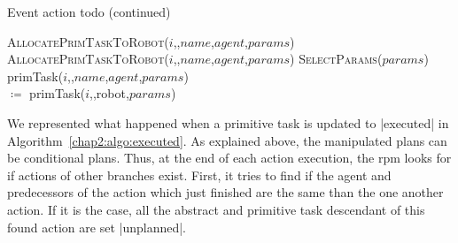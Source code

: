 \documentclass[a4paper,11pt,twoside]{StyleThese}
\begin{document}
\begin{algorithm}[!htb]
	\ContinuedFloat
	\caption{Event action todo (continued)}
	\begin{algorithmic}
			\State \textsc{AllocatePrimTaskToRobot($i$,,$name$,$agent$,$params$)}
		\Else
			\\
			\EndWhile
				\State \textsc{AllocatePrimTaskToRobot($i$,,$name$,$agent$,$params$)}
			\EndIf
		\EndIf
	\EndFunction
	\Statex
		\State \textsc{SelectParams($params$)}
		\State primTask($i$,,$name$,$agent$,$params$) 
		\\\hfill $\coloneqq$ primTask($i$,,robot,$params$)
	\EndFor
	\EndFunction
	\end{algorithmic}
\end{algorithm}


We represented what happened when a primitive task is updated to |executed| in Algorithm~\ref{chap2:algo:executed}. As explained above, the manipulated plans can be conditional plans. Thus, at the end of each action execution, the \acrshort{rpm} looks for if actions of other branches exist. First, it tries to find if the agent and predecessors of the action which just finished are the same than the one another action. If it is the case, all the abstract and primitive task descendant of this found action are set |unplanned|. 
\end{document}
